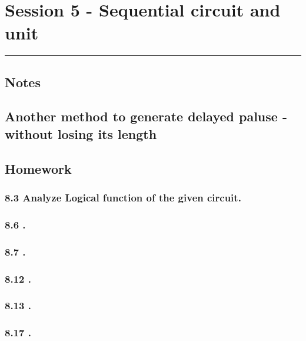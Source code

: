 \section{Session 5 - Sequential circuit and unit}
\vspace{-15pt}\noindent\rule{\textwidth}{0.1pt}\vspace{-10pt}
    \subsection{Notes}
    {\color{hwSolution}
    \subsection*{Another method to generate delayed paluse - without losing its length}
        
        
    }
    \subsection{Homework}
    \subsubsection{8.3 \textnormal{Analyze Logical function of the given circuit}.}
        
    {\color{hwSolution}

    }

    \subsubsection{8.6 \textnormal{}.}
    {\color{hwSolution}

    }

    \subsubsection{8.7 \textnormal{}.}
    {\color{hwSolution}

    }

    \subsubsection{8.12 \textnormal{}.}
    {\color{hwSolution}

    }

    \subsubsection{8.13 \textnormal{}.}
    {\color{hwSolution}

    }

    \subsubsection{8.17 \textnormal{}.}
    {\color{hwSolution}

    }